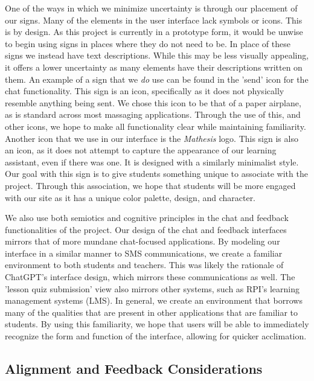 \documentclass[12pt,a4paper]{article}
\begin{document}
    One of the ways in which we minimize uncertainty is through our placement of our signs.  Many
    of the elements in the user interface lack symbols or icons.  This is by design.  As this project
    is currently in a prototype form, it would be unwise to begin using signs in places where they do
    not need to be.  In place of these signs we instead have text descriptions.  While this may be
    less visually appealing, it offers a lower uncertainty as many elements have their descriptions
    written on them.  An example of a sign that we \textit{do} use can be found in the 'send' icon for the
    chat functionality.  This sign is an icon, specifically as it does not physically resemble anything
    being sent.  We chose this icon to be that of a paper airplane, as is standard across most
    massaging applications.  Through the use of this, and other icons, we hope to make all functionality
    clear while maintaining familiarity.  Another icon that we use in our interface is the \textit{Mathesis}
    logo.  This sign is also an icon, as it does not attempt to capture the appearance of our learning
    assistant, even if there was one.  It is designed with a similarly minimalist style.  Our goal with
    this sign is to give students something unique to associate with the project.  Through this
    association, we hope that students will be more engaged with our site as it has a unique color
    palette, design, and character.

    We also use both semiotics and cognitive principles in the chat and feedback functionalities of
    the project.  Our design of the chat and feedback interfaces mirrors that of more mundane chat-focused
    applications.  By modeling our interface in a similar manner to SMS communications, we create a
    familiar environment to both students and teachers.  This was likely the rationale of ChatGPT's
    interface design, which mirrors these communications as well.  The 'lesson quiz submission' view also
    mirrors other systems, such as RPI's learning management systems (LMS).  In general, we create an
    environment that borrows many of the qualities that are present in other applications that are
    familiar to students. By using this familiarity, we hope that users will be able to immediately
    recognize the form and function of the interface, allowing for quicker acclimation.

    \subsection{Alignment and Feedback Considerations}
\end{document}

